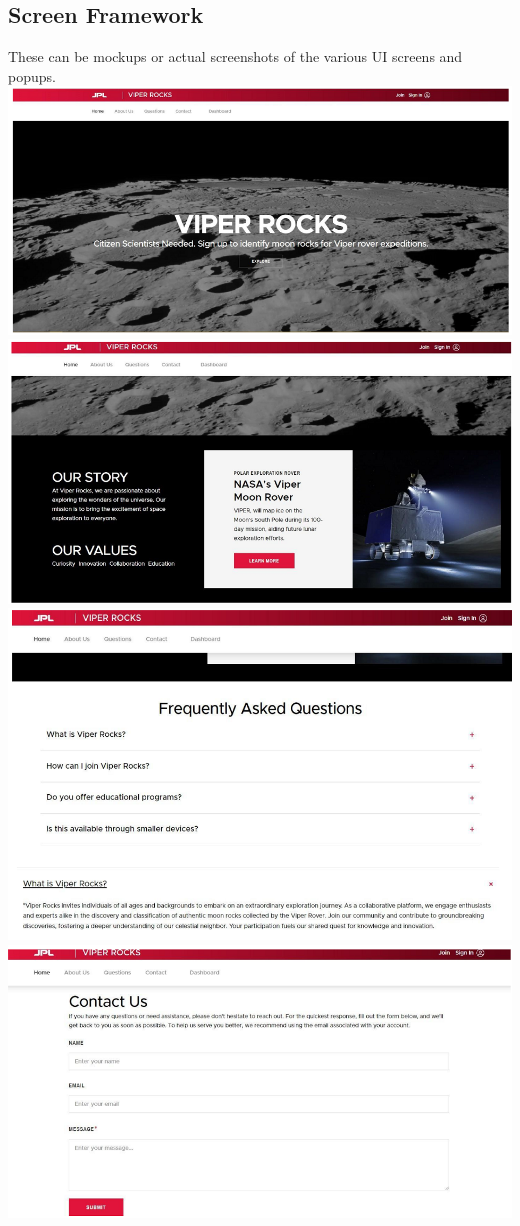 \documentclass{article}
\begin{document}
\subsection{Screen Framework}
These can be mockups or actual screenshots of the various UI screens and popups. \\
\includegraphics{home_page}
\includegraphics{home_page_2}
\includegraphics{faq_page}
\includegraphics{contact_us_page}
\end{document}
